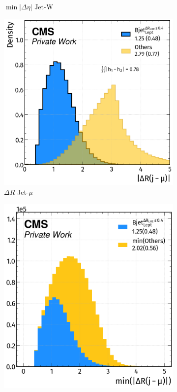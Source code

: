 \begin{figure}[H]
\begin{subfigure}{0.4825\linewidth}
        \caption{$\min|\Delta \eta|$ Jet-${\text{W}}$}
    \end{subfigure}  
    \hfill
    \begin{subfigure}{0.49\linewidth}
        \centering
        \includegraphics[width=1\linewidth]{fig//chap08-kin_reco/dr_mu.png}
        \caption{$\Delta R$ Jet-$\mu$}
    \end{subfigure}
    \hfill
    \begin{subfigure}{0.4585\linewidth}  
        \centering
        \includegraphics[width=1\linewidth]{fig//chap08-kin_reco/min_dr_mu.png}

\end{subfigure}
\end{figure}

